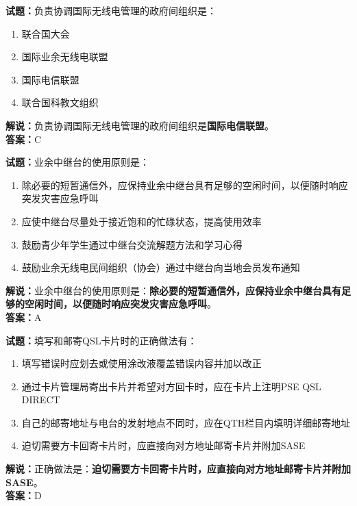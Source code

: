\documentclass{ctexbook}
\begin{document}
\bigskip


\noindent\textbf{试题：}负责协调国际无线电管理的政府间组织是：
\begin{enumerate}[leftmargin=3em]
\item 联合国大会
\item 国际业余无线电联盟
\item 国际电信联盟
\item 联合国科教文组织
\end{enumerate}
\noindent\textbf{解说：}负责协调国际无线电管理的政府间组织是\textbf{国际电信联盟}。\\\noindent\textbf{答案：}C



\bigskip


\noindent\textbf{试题：}业余中继台的使用原则是：
\begin{enumerate}[leftmargin=3em]
\item 除必要的短暂通信外，应保持业余中继台具有足够的空闲时间，以便随时响应突发灾害应急呼叫
\item 应使中继台尽量处于接近饱和的忙碌状态，提高使用效率
\item 鼓励青少年学生通过中继台交流解题方法和学习心得
\item 鼓励业余无线电民间组织（协会）通过中继台向当地会员发布通知
\end{enumerate}
\noindent\textbf{解说：}业余中继台的使用原则是：\textbf{除必要的短暂通信外，应保持业余中继台具有足够的空闲时间，以便随时响应突发灾害应急呼叫}。\\\noindent\textbf{答案：}A



\bigskip


\noindent\textbf{试题：}填写和邮寄QSL卡片时的正确做法有：
\begin{enumerate}[leftmargin=3em]
\item 填写错误时应划去或使用涂改液覆盖错误内容并加以改正
\item 通过卡片管理局寄出卡片并希望对方回卡时，应在卡片上注明PSE QSL DIRECT
\item 自己的邮寄地址与电台的发射地点不同时，应在QTH栏目内填明详细邮寄地址
\item 迫切需要方卡回寄卡片时，应直接向对方地址邮寄卡片并附加SASE
\end{enumerate}
\noindent\textbf{解说：}正确做法是：\textbf{迫切需要方卡回寄卡片时，应直接向对方地址邮寄卡片并附加SASE}。\\\noindent\textbf{答案：}D



\bigskip
\end{document}
